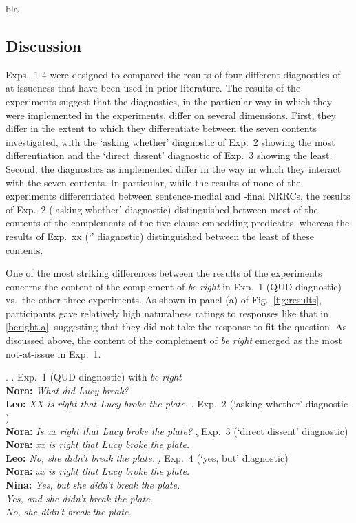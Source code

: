 \documentclass[times,linguex,xcolor]{glossa}
\begin{document}
  bla

  \newpage

  \subsection{Discussion}

  Exps.~1-4 were designed to compared the results of four different diagnostics of at-issueness that have been used in prior literature. The results of the experiments suggest that the diagnostics, in the particular way in which they were implemented in the experiments, differ on several dimensions. First, they differ in the extent to which they differentiate between the seven contents investigated, with the `asking whether' diagnostic of Exp.~2 showing the most differentiation and the `direct dissent' diagnostic of Exp.~3 showing the least. Second, the diagnostics as implemented differ in the way in which they interact with the seven contents. In particular, while the results of none of the experiments differentiated between sentence-medial and -final NRRCs, the results of Exp.~2 (`asking whether' diagnostic) distinguished between most of the contents of the complements of the five clause-embedding predicates, whereas the results of Exp.~xx (`' diagnostic) distinguished between the least of these contents.

  One of the most striking differences between the results of the experiments concerns the content of the complement of \emph{be right} in Exp.~1 (QUD diagnostic) vs.\ the other three experiments. As shown in panel (a) of Fig.~\ref{fig:results}, participants gave relatively high naturalness ratings to responses like that in \ref{beright.a}, suggesting that they did not take the response to fit the question. As discussed above, the content of the complement of \emph{be right} emerged as the most not-at-issue in Exp.~1. 

  \ex.
  \a.\label{beright.a}  Exp.~1 (QUD diagnostic) with \emph{be right}
  \\ {\bf Nora:} \emph{What did Lucy break?}
  \\ {\bf Leo:} \emph{XX is right that Lucy broke the plate.}
  \b.\label{beright.b} Exp.~2 (`asking whether' diagnostic )
  \\ {\bf Nora:} \emph{Is xx right that Lucy broke the plate?}
  \c.\label{beright.c} Exp.~3 (`direct dissent' diagnostic)
  \\ {\bf Nora:} \emph{xx is right that Lucy broke the plate.}
  \\ {\bf Leo:} \emph{No, she didn't break the plate.}
  \d.\label{beright.d} Exp.~4 (`yes, but' diagnostic)
  \\ {\bf Nora:} \emph{xx is right that Lucy broke the plate.}
  \\ {\bf Nina:} \emph{Yes, but she didn't break the plate.}
  \\ \hspace*{1cm} \emph{Yes, and she didn't break the plate.}
  \\ \hspace*{1cm} \emph{No, she didn't break the plate.}
\end{document}
